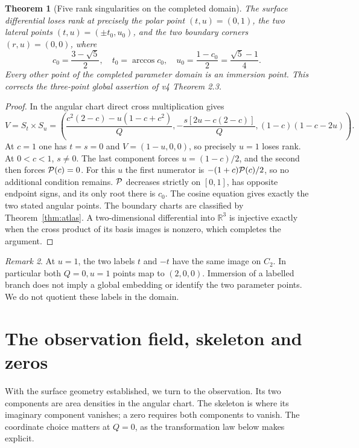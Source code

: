\documentclass[11pt,a4paper]{article}
\newtheorem{theorem}{Theorem}[section]
\theoremstyle{definition}\newtheorem{definition}[theorem]{Definition}
\theoremstyle{remark}\newtheorem{remark}[theorem]{Remark}
\newcommand{\R}{\mathbb R}\newcommand{\C}{\mathbb C}
\begin{document}
\begin{theorem}[Five rank singularities on the completed domain]\label{thm:regularity}
The surface differential loses rank at precisely the polar point $(t,u)=(0,1)$,
the two lateral points $(t,u)=(\pm t_0,u_0)$, and the two boundary
corners $(r,u)=(0,0)$, where
\[
 c_0=\frac{3-\sqrt5}{2},\quad t_0=\arccos c_0,\quad
 u_0=\frac{1-c_0}{2}=\frac{\sqrt5-1}{4}.
\]
Every other point of the completed parameter domain is an immersion point.
This corrects the three-point global assertion of v4 Theorem 2.3.
\end{theorem}
\begin{proof}
In the angular chart direct cross multiplication gives
\begin{equation}\label{eq:cross}
 V=S_t\times S_u=\left(
 \frac{c^2(2-c)-u(1-c+c^2)}Q,
 -\frac{s[2u-c(2-c)]}Q,
 (1-c)(1-c-2u)\right).
\end{equation}
At $c=1$ one has $t=s=0$ and $V=(1-u,0,0)$, so precisely $u=1$
loses rank. At $0<c<1$, $s\ne0$. The last component forces
$u=(1-c)/2$, and the second then forces $\mathcal P(c)=0$.
For this $u$ the first numerator is
$-(1+c)\mathcal P(c)/2$, so no additional condition remains.
$\mathcal P$ decreases strictly on $[0,1]$, has opposite endpoint signs,
and its only root there is $c_0$. The cosine equation gives exactly the
two stated angular points. The boundary charts are classified by
Theorem~\ref{thm:atlas}. A two-dimensional differential into $\R^3$ is
injective exactly when the cross product of its basis images is nonzero,
which completes the argument.
\end{proof}
\begin{remark}
At $u=1$, the two labels $t$ and $-t$ have the same image on $C_2$.
In particular both $Q=0,u=1$ points map to $(2,0,0)$. Immersion of a
labelled branch does not imply a global embedding or identify the two
parameter points. We do not quotient these labels in the domain.
\end{remark}

\section{The observation field, skeleton and zeros}\label{sec:observation}
With the surface geometry established, we turn to the observation. Its two
components are area densities in the angular chart. The skeleton is where its imaginary
component vanishes; a zero requires both components to vanish. The coordinate
choice matters at $Q=0$, as the transformation law below makes explicit.
\end{document}
